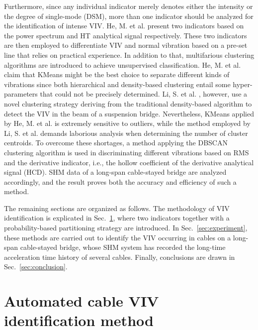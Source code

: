 \documentclass[preprint, 3p, times, compress, 11pt]{elsarticle}
\begin{document}
Furthermore, since any individual indicator merely denotes either the 
intensity or the degree of single-mode (DSM), more than one indicator should 
be analyzed for the identification of intense VIV. 
He, M. et al. \cite{he2022online} 
present two indicators based on the power spectrum and HT analytical 
signal respectively. These two indicators are then employed to 
differentiate VIV and normal vibration based on a pre-set line that 
relies on practical experience. In addition to that, multifarious 
clustering algorithms are introduced to achieve unsupervised 
classification. He, M. et al. \cite{he2022identification} claim that 
KMeans might be the best choice to separate different kinds of vibrations 
since both hierarchical and density-based clustering entail some 
hyper-parameters that could not be precisely determined. Li, S. et al. 
\cite{li2017cluster}, however, use a novel clustering strategy deriving 
from the traditional density-based algorithm to detect the VIV in the 
beam of a suspension bridge. Nevertheless, KMeans applied by He, M. et al. 
\cite{he2022identification} is extremely sensitive to outliers, while the method 
employed by Li, S. et al. \cite{li2017cluster} demands laborious analysis 
when determining the number of cluster centroids. To overcome these 
shortages, a method applying the DBSCAN clustering algorithm is used 
in discriminating different vibrations based on RMS and the derivative 
indicator, i.e., the hollow coefficient of the derivative analytical 
signal (HCD). SHM data of a long-span cable-stayed bridge are analyzed 
accordingly, and the result proves both the accuracy and efficiency of 
such a method.

The remaining sections are organized as follows. The methodology of VIV 
identification is explicated in Sec.~\ref{sec:method}, where two indicators 
together with a probability-based partitioning strategy are introduced. 
In Sec.~\ref{sec:experiment}, these methods are carried out to identify 
the VIV occurring in cables on a long-span cable-stayed bridge, whose 
SHM system has recorded the long-time acceleration time history of several
cables. Finally, conclusions are drawn in Sec.~\ref{sec:conclusion}.

\section{Automated cable VIV identification method}
\label{sec:method}
\end{document}
